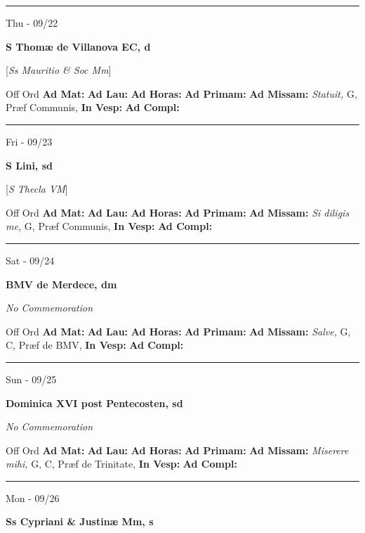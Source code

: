 \documentclass[letterpaper, 10pt]{article}
\begin{document}
\hrule
\begin{center}
Thu - 09/22
\end{center}\textbf{ \large S Thomæ de Villanova EC, \textnormal{\normalsize d}}

[\textit{Ss Mauritio \& Soc Mm}]
\begin{justify}
Off Ord
\textbf{Ad Mat: }
\textbf{Ad Lau: }
\textbf{Ad Horas: }
\textbf{Ad Primam: }
\textbf{Ad Missam:} \textit{Statuit, } G, Præf Communis, 
\textbf{In Vesp: }
\textbf{Ad Compl: }\end{justify}



\hrule
\begin{center}
Fri - 09/23
\end{center}\textbf{ \large S Lini, \textnormal{\normalsize sd}}

[\textit{S Thecla VM}]
\begin{justify}
Off Ord
\textbf{Ad Mat: }
\textbf{Ad Lau: }
\textbf{Ad Horas: }
\textbf{Ad Primam: }
\textbf{Ad Missam:} \textit{Si diligis me, } G, Præf Communis, 
\textbf{In Vesp: }
\textbf{Ad Compl: }\end{justify}



\hrule
\begin{center}
Sat - 09/24
\end{center}\textbf{ \large BMV de Merdece, \textnormal{\normalsize dm}}

\textit{No Commemoration}\begin{justify}
Off Ord
\textbf{Ad Mat: }
\textbf{Ad Lau: }
\textbf{Ad Horas: }
\textbf{Ad Primam: }
\textbf{Ad Missam:} \textit{Salve, } G, C, Præf de BMV, 
\textbf{In Vesp: }
\textbf{Ad Compl: }\end{justify}



\hrule
\begin{center}
Sun - 09/25
\end{center}\textbf{ \large Dominica XVI post Pentecosten, \textnormal{\normalsize sd}}

\textit{No Commemoration}\begin{justify}
Off Ord
\textbf{Ad Mat: }
\textbf{Ad Lau: }
\textbf{Ad Horas: }
\textbf{Ad Primam: }
\textbf{Ad Missam:} \textit{Miserere mihi, } G, C, Præf de Trinitate, 
\textbf{In Vesp: }
\textbf{Ad Compl: }\end{justify}



\hrule
\begin{center}
Mon - 09/26
\end{center}\textbf{ \large Ss Cypriani \& Justinæ Mm, \textnormal{\normalsize s}}
\end{document}
